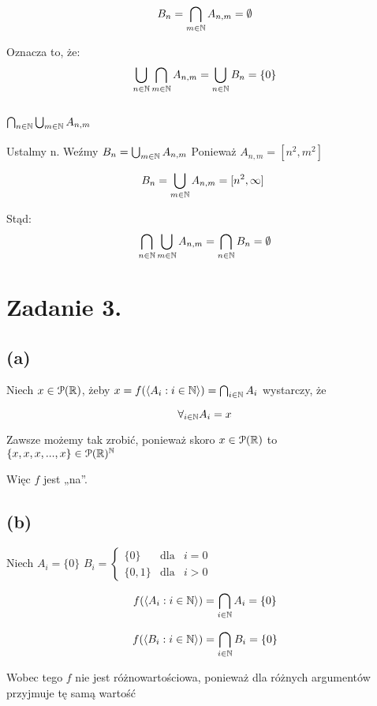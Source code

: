 \documentclass{article}
\begin{document}
\[	B_n = \bigcap_{m \in \mathbb{N}} A_{n,m} = \emptyset	\]

Oznacza to, że:
\[	\bigcup_{n \in \mathbb{N}} \bigcap_{m \in \mathbb{N}} A_{n,m} = \bigcup_{n \in \mathbb{N}} B_n = \{0\}	\]

\subsection*{$\bigcap_{n \in \mathbb{N}} \bigcup_{m \in \mathbb{N}} A_{n,m}$}

Ustalmy n. Weźmy $B_n = \bigcup_{m \in \mathbb{N}} A_{n,m}$
Ponieważ $A_{n,m} = [n^2,m^2]$ 

\[	B_n = \bigcup_{m \in \nat} A_{n,m} = [n^2,\infty]\	\] 

Stąd:
\[	\bigcap_{n \in \mathbb{N}} \bigcup_{m \in \mathbb{N}} A_{n,m} = \bigcap_{n \in \mathbb{N}} B_n = \emptyset	\]



\section*{Zadanie 3.}

\subsection*{(a)}
Niech  $x \in \mathcal{P} (\mathbb{R})$, żeby $x = f(\langle A_i : i \in \mathbb{N} \rangle) = \bigcap_{i \in \mathbb{N}} A_i$
wystarczy, że 

\[\forall_{i \in \mathbb{N}} A_i = x\]

Zawsze możemy tak zrobić, ponieważ skoro $x \in \mathcal{P}(\mathbb{R})$ to \\
$\{x,x,x,...,x\} \in \mathcal{P}(\mathbb{R})^{\mathbb{N}}$

Więc $f$ jest „na”. 

\subsection*{(b)}
Niech $A_i = \{0\}$
$B_i = \left\{ \begin{array}{rcl}
\{0\} & \mbox{dla}
& i = 0\\ \{0,1\} & \mbox{dla} & i>0  
\end{array}\right.$

\[f(\langle A_i : i \in \mathbb{N} \rangle) = \bigcap_{i \in \mathbb{N}} A_i = \{0\}\]

\[f(\langle B_i : i \in \mathbb{N} \rangle) = \bigcap_{i \in \mathbb{N}} B_i = \{0\}\]

Wobec tego $f$ nie jest różnowartościowa, ponieważ dla różnych argumentów przyjmuje tę samą wartość
\end{document}
